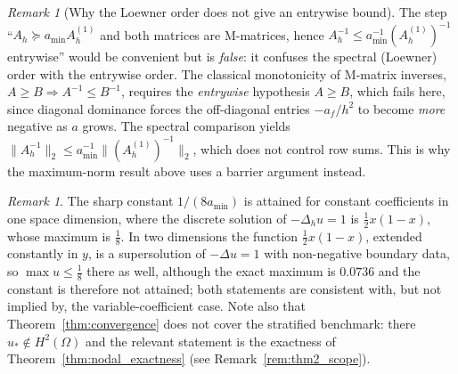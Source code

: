 \documentclass[11pt,a4paper]{article}
\theoremstyle{definition}
\theoremstyle{remark}
\newtheorem{remark}[theorem]{Remark}
\begin{document}
\begin{remark}[Why the Loewner order does not give an entrywise bound]
\label{rem:entrywise_false}
The step ``$A_h\succeq a_{\min}A_h^{(1)}$ and both matrices are M-matrices, hence $A_h^{-1}\le a_{\min}^{-1}(A_h^{(1)})^{-1}$ entrywise'' would be convenient but is \emph{false}: it confuses the spectral (Loewner) order with the entrywise order. The classical monotonicity of M-matrix inverses, $A\ge B\Rightarrow A^{-1}\le B^{-1}$, requires the \emph{entrywise} hypothesis $A\ge B$, which fails here, since diagonal dominance forces the off-diagonal entries $-a_f/h^2$ to become \emph{more} negative as $a$ grows. The spectral comparison yields
$\|A_h^{-1}\|_2\le a_{\min}^{-1}\|(A_h^{(1)})^{-1}\|_2$,
which does not control row sums. This is why the maximum-norm result above
uses a barrier argument instead.
\end{remark}

\begin{remark}\label{rem:conv_constant}
The sharp constant $1/(8a_{\min})$ is attained for constant coefficients in one space dimension, where the discrete solution of $-\Delta_h u=1$ is $\frac12x(1-x)$, whose maximum is $\frac18$. In two dimensions the function $\frac12x(1-x)$, extended constantly in $y$, is a supersolution of $-\Delta u=1$ with non-negative boundary data, so $\max u\le\frac18$ there as well, although the exact maximum is $0.0736$ and the constant is therefore not attained; both statements are consistent with, but not implied by, the variable-coefficient case. Note also that Theorem~\ref{thm:convergence} does not cover the stratified benchmark: there $u_*\notin H^2(\Omega)$ and the relevant statement is the exactness of Theorem~\ref{thm:nodal_exactness} (see Remark~\ref{rem:thm2_scope}).
\end{remark}
\end{document}
